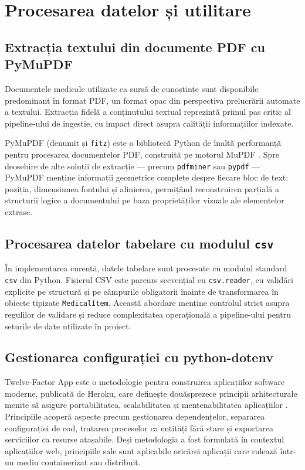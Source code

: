 \documentclass[12pt, a4paper, oneside, romanian]{teza-upb}
\begin{document}
\section{Procesarea datelor și utilitare}

\subsection{Extracția textului din documente PDF cu PyMuPDF}

Documentele medicale utilizate ca sursă de cunoștințe sunt disponibile predominant în format PDF, un format opac din perspectiva prelucrării automate a textului. Extracția fidelă a conținutului textual reprezintă primul pas critic al pipeline-ului de ingestie, cu impact direct asupra calității informațiilor indexate.

PyMuPDF (denumit și \texttt{fitz}) este o bibliotecă Python de înaltă performanță pentru procesarea documentelor PDF, construită pe motorul MuPDF \cite{pymupdf_doc}. Spre deosebire de alte soluții de extracție — precum \texttt{pdfminer} sau \texttt{pypdf} — PyMuPDF menține informații geometrice complete despre fiecare bloc de text: poziția, dimensiunea fontului și alinierea, permițând reconstruirea parțială a structurii logice a documentului pe baza proprietăților vizuale ale elementelor extrase.

\subsection{Procesarea datelor tabelare cu modulul \texttt{csv}}

În implementarea curentă, datele tabelare sunt procesate cu modulul standard
\texttt{csv} din Python. Fișierul CSV este parcurs secvențial cu \texttt{csv.reader}, cu
validări explicite pe structură și pe câmpurile obligatorii înainte de
transformarea în obiecte tipizate \texttt{MedicalItem}. Această abordare menține
controlul strict asupra regulilor de validare și reduce complexitatea
operațională a pipeline-ului pentru seturile de date utilizate în proiect.
\subsection{Gestionarea configurației cu python-dotenv}

Twelve-Factor App este o metodologie pentru construirea aplicațiilor software 
moderne, publicată de Heroku, care definește douăsprezece principii arhitecturale 
menite să asigure portabilitatea, scalabilitatea și mentenabilitatea aplicațiilor 
\cite{twelvefactor}. Principiile acoperă aspecte precum gestionarea dependențelor, 
separarea configurației de cod, tratarea proceselor ca entități fără stare și 
exportarea serviciilor ca resurse atașabile. Deși metodologia a fost formulată 
în contextul aplicațiilor web, principiile sale sunt aplicabile oricărei aplicații 
care rulează într-un mediu containerizat sau distribuit.
\end{document}
